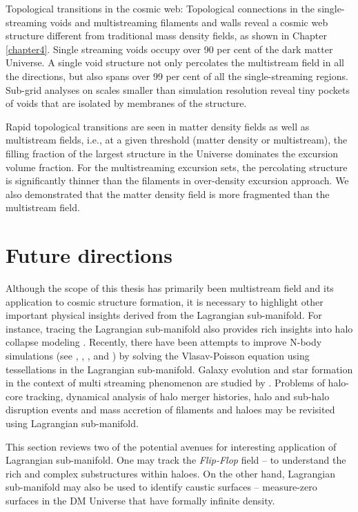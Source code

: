 Topological transitions in the cosmic web: Topological connections in the single-streaming voids and multistreaming filaments and walls reveal a cosmic web structure different from traditional mass density fields, as shown in Chapter \ref{chapter4}. Single streaming voids occupy over 90 per cent of the dark matter Universe. A single void structure not only percolates the multistream field in all the directions, but also spans over 99 per cent of all the single-streaming regions. Sub-grid analyses on scales smaller than simulation resolution reveal tiny pockets of voids that are isolated by membranes of the structure. 

Rapid topological transitions are seen in matter density fields as well as multistream fields, i.e., at a given threshold (matter density or multistream), the filling fraction of the largest structure in the Universe dominates the excursion volume fraction. For the multistreaming excursion sets, the percolating structure is significantly thinner than the filaments in over-density excursion approach. We also demonstrated that the matter density field is more fragmented than the multistream field. 
 


\section{Future directions}

Although the scope of this thesis has primarily been multistream field and its application to cosmic structure formation, it is necessary to highlight other important physical insights derived from the Lagrangian sub-manifold. For instance, tracing the Lagrangian sub-manifold also provides rich insights into halo collapse modeling \cite{Neyrinck2016}. Recently, there have been attempts to improve N-body simulations (see \cite{Hahn2013}, \cite{Angulo2013a}, \cite{Angulo2013b}, \cite{Sousbie2015} and \cite{Hahn2016a}) by solving the Vlasav-Poisson equation using tessellations in the Lagrangian sub-manifold. Galaxy evolution and star formation in the context of multi streaming phenomenon are studied by \cite{Aragon-Calvo2016}. Problems of halo-core tracking, dynamical analysis of halo merger histories, halo and sub-halo disruption events and mass accretion of filaments and haloes may be revisited using Lagrangian sub-manifold.

This section reviews two of the potential avenues for interesting application of Lagrangian sub-manifold. One may track the {\it Flip-Flop} field -- to understand the rich and complex substructures within haloes. On the other hand, Lagrangian sub-manifold may also be used to identify caustic surfaces -- measure-zero surfaces in the DM Universe that have formally infinite density. 


